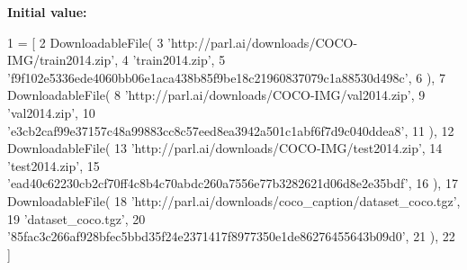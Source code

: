 {\bfseries Initial value\+:}
\begin{DoxyCode}
1 =  [
2     DownloadableFile(
3         \textcolor{stringliteral}{'http://parl.ai/downloads/COCO-IMG/train2014.zip'},
4         \textcolor{stringliteral}{'train2014.zip'},
5         \textcolor{stringliteral}{'f9f102e5336ede4060bb06e1aca438b85f9be18c21960837079c1a88530d498c'},
6     ),
7     DownloadableFile(
8         \textcolor{stringliteral}{'http://parl.ai/downloads/COCO-IMG/val2014.zip'},
9         \textcolor{stringliteral}{'val2014.zip'},
10         \textcolor{stringliteral}{'e3cb2caf99e37157c48a99883cc8c57eed8ea3942a501c1abf6f7d9c040ddea8'},
11     ),
12     DownloadableFile(
13         \textcolor{stringliteral}{'http://parl.ai/downloads/COCO-IMG/test2014.zip'},
14         \textcolor{stringliteral}{'test2014.zip'},
15         \textcolor{stringliteral}{'ead40c62230cb2cf70ff4c8b4c70abdc260a7556e77b3282621d06d8e2e35bdf'},
16     ),
17     DownloadableFile(
18         \textcolor{stringliteral}{'http://parl.ai/downloads/coco\_caption/dataset\_coco.tgz'},
19         \textcolor{stringliteral}{'dataset\_coco.tgz'},
20         \textcolor{stringliteral}{'85fac3c266af928bfec5bbd35f24e2371417f8977350e1de86276455643b09d0'},
21     ),
22 ]
\end{DoxyCode}
